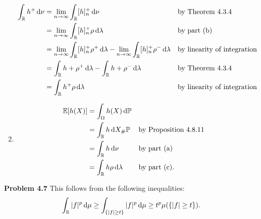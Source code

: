 \begin{enumerate}[label=(\alph*)]
\begin{align*}
	\int_{\mathbb R} h^+ \, \mathrm{d} \nu &= \lim_{n \to \infty} \int_{\mathbb R} [h]_n^+ \, \mathrm{d} \nu &&\text{by Theorem 4.3.4}\\
	&= \lim_{n \to \infty} \int_{\mathbb R} [h]_n^+ \rho \, \mathrm{d} \lambda &&\text{by part (b)} \\
	&= \lim_{n \to \infty} \int_{\mathbb R} [h]_n^+ \rho^+ \, \mathrm{d} \lambda
		- \lim_{n \to \infty} \int_{\mathbb R} [h]_n^+ \rho^- \, \mathrm{d} \lambda &&\text{by linearity of integration} \\
	&= \int_{\mathbb R} h+ \rho^+ \, \mathrm{d} \lambda - \int_{\mathbb R} h+ \rho^- \, \mathrm{d} \lambda &&\text{by Theorem 4.3.4} \\
	&= \int_{\mathbb R} h^+ \rho \, \mathrm{d} \lambda &&\text{by linearity of integration}
\end{align*}
\item 
\begin{align*}
	\mathbb E[h(X)] &= \int_\Omega h(X) \, \mathrm{d} \mathbb P \\
	&= \int_{\mathbb R} h \, \mathrm{d} X_\# \mathbb P &&\text{by Proposition 4.8.11}\\
	&= \int_{\mathbb R} h \, \mathrm{d} \nu &&\text{by part (a)}\\
	&= \int_{\mathbb R} h \rho \, \mathrm{d} \lambda &&\text{by part (c)}.
\end{align*}
\end{enumerate}   

\bigskip
\textbf{Problem 4.7}
This follows from the following inequalities:
\[
	\int_{\mathbb R} |f|^p \, \mathrm{d} \mu \ge \int_{\{|f| \ge t\}} |f|^p \, \mathrm{d} \mu
	\ge t^p \mu(\{|f| \ge t\}).
\]